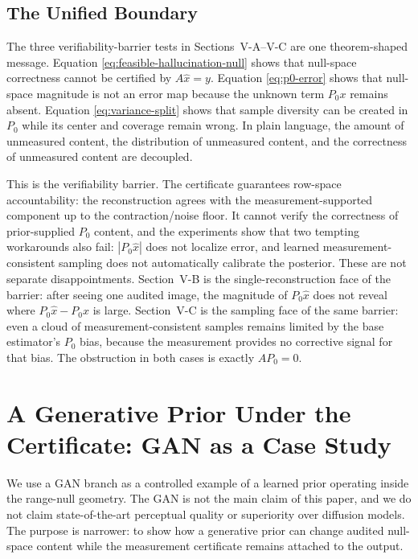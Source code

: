 \documentclass[journal]{IEEEtran}
\newcommand{\PZ}{P_{0}}
\begin{document}
\subsection{The Unified Boundary}

The three verifiability-barrier tests in Sections~V-A--V-C are one
theorem-shaped message.  Equation
\eqref{eq:feasible-hallucination-null} shows that null-space correctness cannot
be certified by $A\hat{x}=y$.  Equation \eqref{eq:p0-error} shows that
null-space magnitude is not an error map because the unknown term $\PZ x$
remains absent.  Equation \eqref{eq:variance-split} shows that sample diversity
can be created in $\PZ$ while its center and coverage remain wrong.  In plain
language, the amount of unmeasured content, the distribution of unmeasured
content, and the correctness of unmeasured content are decoupled.

This is the verifiability barrier.  The certificate guarantees row-space
accountability: the reconstruction agrees with the measurement-supported
component up to the contraction/noise floor.  It cannot verify the correctness
of prior-supplied $\PZ$ content, and the experiments show that two tempting
workarounds also fail: $|\PZ\hat{x}|$ does not localize error, and learned
measurement-consistent sampling does not automatically calibrate the posterior.
These are not separate disappointments.  Section~V-B is the single-reconstruction
face of the barrier: after seeing one audited image, the magnitude of
$\PZ\hat{x}$ does not reveal where $\PZ\hat{x}-\PZ x$ is large.  Section~V-C is
the sampling face of the same barrier: even a cloud of measurement-consistent
samples remains limited by the base estimator's $\PZ$ bias, because the
measurement provides no corrective signal for that bias.  The obstruction in
both cases is exactly $A\PZ=0$.

\section{A Generative Prior Under the Certificate: GAN as a Case Study}
\label{sec:gan}

We use a GAN branch as a controlled example of a learned prior operating inside
the range-null geometry.  The GAN is not the main claim of this paper, and we do
not claim state-of-the-art perceptual quality or superiority over diffusion
models.  The purpose is narrower: to show how a generative prior can change
audited null-space content while the measurement certificate remains attached to
the output.
\end{document}
